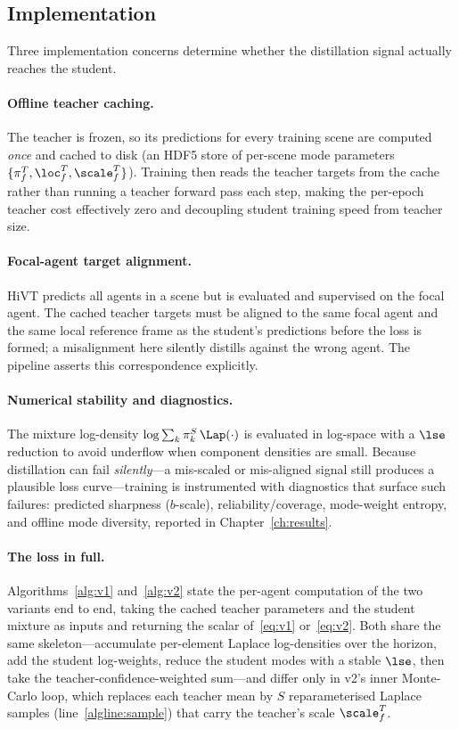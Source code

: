 \subsection{Implementation}
\label{ssec:method_impl}
Three implementation concerns determine whether the distillation signal actually
reaches the student.

\paragraph{Offline teacher caching.}
The teacher is frozen, so its predictions for every training scene are computed
\emph{once} and cached to disk (an HDF5 store of per-scene mode parameters
$\{\pi^T_f,\loc^T_f,\scale^T_f\}$). Training then reads the teacher targets from the
cache rather than running a teacher forward pass each step, making the per-epoch
teacher cost effectively zero and decoupling student training speed from teacher
size.

\paragraph{Focal-agent target alignment.}
HiVT predicts all agents in a scene but is evaluated and supervised on the focal
agent. The cached teacher targets must be aligned to the same focal agent and the
same local reference frame as the student's predictions before the loss is formed;
a misalignment here silently distills against the wrong agent. The pipeline asserts
this correspondence explicitly.

\paragraph{Numerical stability and diagnostics.}
The mixture log-density $\log\sum_k \pi^S_k\,\Lap(\cdot)$ is evaluated in
log-space with a $\lse$ reduction to avoid underflow when component densities are
small. Because distillation can fail \emph{silently}---a mis-scaled or
mis-aligned signal still produces a plausible loss curve---training is instrumented
with diagnostics that surface such failures: predicted sharpness ($b$-scale),
reliability/coverage, mode-weight entropy, and offline mode diversity, reported in
Chapter~\ref{ch:results}.

\paragraph{The loss in full.}
Algorithms~\ref{alg:v1} and~\ref{alg:v2} state the per-agent computation of the two
variants end to end, taking the cached teacher parameters and the student mixture as
inputs and returning the scalar of~\eqref{eq:v1} or~\eqref{eq:v2}. Both share the
same skeleton---accumulate per-element Laplace log-densities over the horizon, add
the student log-weights, reduce the student modes with a stable $\lse$, then take the
teacher-confidence-weighted sum---and differ only in v2's inner Monte-Carlo loop,
which replaces each teacher mean by $S$ reparameterised Laplace samples
(line~\ref{algline:sample}) that carry the teacher's scale $\scale^T_f$.

